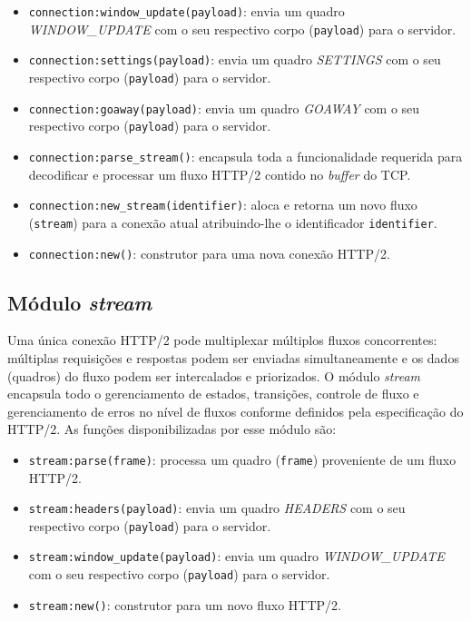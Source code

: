 \begin{itemize}
    \item \verb|connection:window_update(payload)|: envia um quadro {\em WINDOW\_UPDATE} com o seu respectivo corpo (\verb|payload|) para o servidor.
    \item \verb|connection:settings(payload)|: envia um quadro {\em SETTINGS} com o seu respectivo corpo (\verb|payload|) para o servidor.
    \item \verb|connection:goaway(payload)|: envia um quadro {\em GOAWAY} com o seu respectivo corpo (\verb|payload|) para o servidor.
    \item \verb|connection:parse_stream()|: encapsula toda a funcionalidade requerida para decodificar e processar um fluxo HTTP/2 contido no {\em buffer} do TCP.
    \item \verb|connection:new_stream(identifier)|: aloca e retorna um novo fluxo (\verb|stream|) para a conexão atual atribuindo-lhe o identificador \verb|identifier|.
    \item \verb|connection:new()|: construtor para uma nova conexão HTTP/2.
\end{itemize}

\subsection{Módulo {\em stream}}
\label{subsec:stream}

Uma única conexão HTTP/2 pode multiplexar múltiplos fluxos concorrentes: múltiplas requisições e respostas podem ser enviadas simultaneamente e os dados (quadros) do fluxo podem ser intercalados e priorizados. O módulo {\em stream} encapsula todo o gerenciamento de estados, transições, controle de fluxo e gerenciamento de erros no nível de fluxos conforme definidos pela especificação do HTTP/2. As funções disponibilizadas por esse módulo são:

\begin{itemize}
    \item \verb|stream:parse(frame)|: processa um quadro (\verb|frame|) proveniente de um fluxo HTTP/2.
    \item \verb|stream:headers(payload)|: envia um quadro {\em HEADERS} com o seu respectivo corpo (\verb|payload|) para o servidor.
    \item \verb|stream:window_update(payload)|: envia um quadro {\em WINDOW\_UPDATE} com o seu respectivo corpo (\verb|payload|) para o servidor.
    \item \verb|stream:new()|: construtor para um novo fluxo HTTP/2.
\end{itemize}

